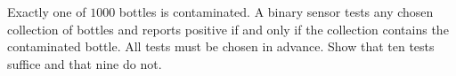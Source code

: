 Exactly one of $1000$ bottles is contaminated. A binary sensor tests any chosen collection of bottles and reports positive if and only if the collection contains the contaminated bottle. All tests must be chosen in advance. Show that ten tests suffice and that nine do not.
